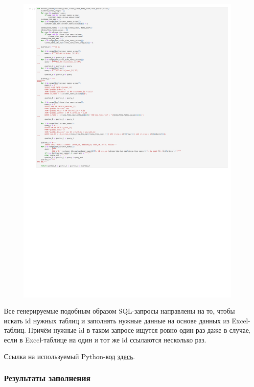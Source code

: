 \documentclass[a4paper,12pt]{article}
\renewcommand{\^}[2]{#1^{\, #2} \kern -1pt}
\newcommand{\1}{\kern 1pt}
\newcommand{\0}{\kern -1pt}
\begin{document}
	\begin{figure}[h]
		\hspace{-0.5cm}\includegraphics[scale=0.6,page=1]{table_inserts_excel/sql_tickets_insert}\label{fig:figure4}
	\end{figure}

	Все генерируемые подобным образом SQL-запросы направлены на то, чтобы искать id нужных таблиц и заполнять нужные данные на основе данных из Excel-таблиц. Причём нужные id в таком запросе ищутся ровно один раз даже в случае, если в Excel-таблице на один и тот же id ссылаются несколько раз.

	Ссылка на используемый Python-код \href{https://github.com/miharbm/lab_db/blob/main/ipynb/sql_insert.ipynb}{здесь}.
	
	\subsubsection{Результаты заполнения}
	
\end{document}
